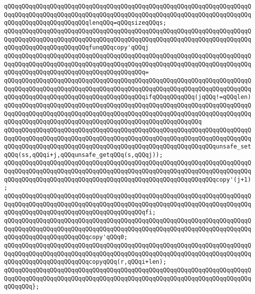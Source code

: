 \verb|qQQqqQQqqQQqqQQqqQQqqQQqqQQqqQQqqQQqqQQqqQQqqQQqqQQqqQQqqQQqqQQqqQQqqQQqqQQqqQQqqQQqqQQqqQQqqQQqqQQqqQQqqQQqqQQqqQQqqQQqqQQqqQQqqQQqqQQqqQQqqQQqqQQqqQQqqQQqqQQqqQQqlenqQQq=qQQqsizeqQQqs;|\newline
\verb|qQQqqQQqqQQqqQQqqQQqqQQqqQQqqQQqqQQqqQQqqQQqqQQqqQQqqQQqqQQqqQQqqQQqqQQqqQQqqQQqqQQqqQQqqQQqqQQqqQQqqQQqqQQqqQQqqQQqqQQqqQQqqQQqqQQqqQQqqQQqqQQqqQQqqQQqqQQqqQQqqQQqfunqQQqcopy'qQQqj|\newline
\verb|qQQqqQQqqQQqqQQqqQQqqQQqqQQqqQQqqQQqqQQqqQQqqQQqqQQqqQQqqQQqqQQqqQQqqQQqqQQqqQQqqQQqqQQqqQQqqQQqqQQqqQQqqQQqqQQqqQQqqQQqqQQqqQQqqQQqqQQqqQQqqQQqqQQqqQQqqQQqqQQqqQQqqQQqqQQqqQQqqQQq=|\newline
\verb|qQQqqQQqqQQqqQQqqQQqqQQqqQQqqQQqqQQqqQQqqQQqqQQqqQQqqQQqqQQqqQQqqQQqqQQqqQQqqQQqqQQqqQQqqQQqqQQqqQQqqQQqqQQqqQQqqQQqqQQqqQQqqQQqqQQqqQQqqQQqqQQqqQQqqQQqqQQqqQQqqQQqqQQqqQQqqQQqqQQqifqQQqqQQqqQQq(jqQQq!=qQQqlen)|\newline
\verb|qQQqqQQqqQQqqQQqqQQqqQQqqQQqqQQqqQQqqQQqqQQqqQQqqQQqqQQqqQQqqQQqqQQqqQQqqQQqqQQqqQQqqQQqqQQqqQQqqQQqqQQqqQQqqQQqqQQqqQQqqQQqqQQqqQQqqQQqqQQqqQQqqQQqqQQqqQQqqQQqqQQqqQQqqQQqqQQqqQQqqQQqqQQqqQQqqQQq|\newline
\verb|qQQqqQQqqQQqqQQqqQQqqQQqqQQqqQQqqQQqqQQqqQQqqQQqqQQqqQQqqQQqqQQqqQQqqQQqqQQqqQQqqQQqqQQqqQQqqQQqqQQqqQQqqQQqqQQqqQQqqQQqqQQqqQQqqQQqqQQqqQQqqQQqqQQqqQQqqQQqqQQqqQQqqQQqqQQqqQQqqQQqqQQqqQQqqQQqqQQqqQQqunsafe_setqQQq(ss,qQQqi+j,qQQqunsafe_getqQQq(s,qQQqj));|\newline
\verb|qQQqqQQqqQQqqQQqqQQqqQQqqQQqqQQqqQQqqQQqqQQqqQQqqQQqqQQqqQQqqQQqqQQqqQQqqQQqqQQqqQQqqQQqqQQqqQQqqQQqqQQqqQQqqQQqqQQqqQQqqQQqqQQqqQQqqQQqqQQqqQQqqQQqqQQqqQQqqQQqqQQqqQQqqQQqqQQqqQQqqQQqqQQqqQQqqQQqqQQqcopy'(j+1);|\newline
\verb|qQQqqQQqqQQqqQQqqQQqqQQqqQQqqQQqqQQqqQQqqQQqqQQqqQQqqQQqqQQqqQQqqQQqqQQqqQQqqQQqqQQqqQQqqQQqqQQqqQQqqQQqqQQqqQQqqQQqqQQqqQQqqQQqqQQqqQQqqQQqqQQqqQQqqQQqqQQqqQQqqQQqqQQqqQQqqQQqqQQqfi;|\newline
\newline
\verb|qQQqqQQqqQQqqQQqqQQqqQQqqQQqqQQqqQQqqQQqqQQqqQQqqQQqqQQqqQQqqQQqqQQqqQQqqQQqqQQqqQQqqQQqqQQqqQQqqQQqqQQqqQQqqQQqqQQqqQQqqQQqqQQqqQQqqQQqqQQqqQQqqQQqqQQqqQQqqQQqqQQqcopy'qQQq0;|\newline
\verb|qQQqqQQqqQQqqQQqqQQqqQQqqQQqqQQqqQQqqQQqqQQqqQQqqQQqqQQqqQQqqQQqqQQqqQQqqQQqqQQqqQQqqQQqqQQqqQQqqQQqqQQqqQQqqQQqqQQqqQQqqQQqqQQqqQQqqQQqqQQqqQQqqQQqqQQqqQQqqQQqqQQqcopyqQQq(r,qQQqi+len);|\newline
\verb|qQQqqQQqqQQqqQQqqQQqqQQqqQQqqQQqqQQqqQQqqQQqqQQqqQQqqQQqqQQqqQQqqQQqqQQqqQQqqQQqqQQqqQQqqQQqqQQqqQQqqQQqqQQqqQQqqQQqqQQqqQQqqQQqqQQqqQQqqQQqqQQqqQQq};|\newline
